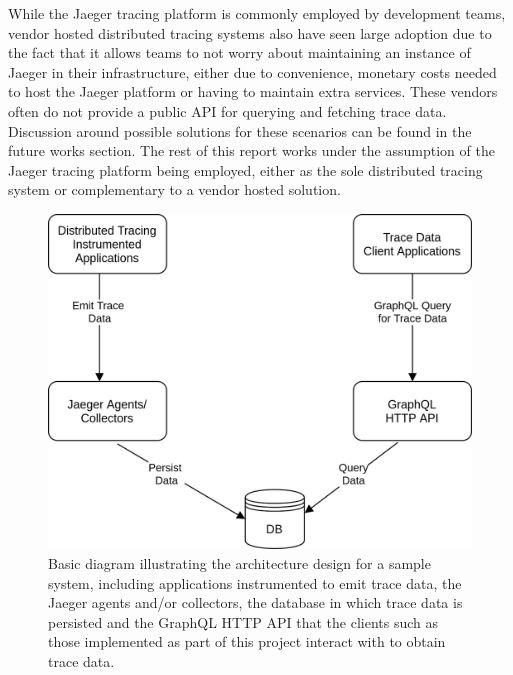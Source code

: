 \documentclass[12pt,pdftex,titlepage]{report}
\begin{document}
                    While the Jaeger tracing platform is commonly employed by development teams, vendor hosted distributed tracing systems also have seen large adoption due to the 
                    fact that it allows teams to not worry about maintaining an instance of Jaeger in their infrastructure, either due to convenience, monetary costs needed to host
                    the Jaeger platform or having to maintain extra services. These vendors often do not provide a public API for querying and fetching trace data. Discussion around
                    possible solutions for these scenarios can be found in the future works section. The rest of this report works under the assumption of the Jaeger tracing platform
                    being employed, either as the sole distributed tracing system or complementary to a vendor hosted solution. 

                \begin{figure}[hbt!]
                    \centering
                    \includegraphics[scale=0.2]{arch.png}
                    \caption{Basic diagram illustrating the architecture design for a sample system, including applications instrumented to emit trace data, the Jaeger agents and/or collectors,
                    the database in which trace data is persisted and the GraphQL HTTP API that the clients such as those implemented as part of this project interact with to obtain trace data.}
                    \label{fig:arch}
                \end{figure}
\end{document}
